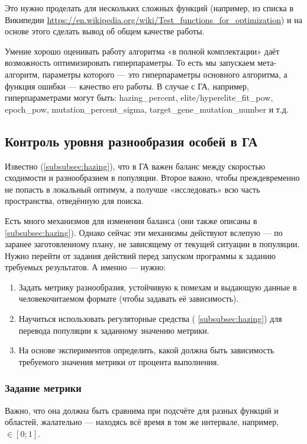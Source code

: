 Это нужно проделать для нескольких сложных функций (например, из списка в Википедии \href{https://en.wikipedia.org/wiki/Test_functions_for_optimization}{https://en.wikipedia.org/wiki/Test_functions_for_optimization})
и на основе этого сделать вывод об общем качестве работы.

Умение хорошо оценивать работу алгоритма «в полной комплектации» даёт возможность оптимизировать гиперпараметры.
То есть мы запускаем мета-алгоритм, параметры которого — это гиперпараметры основного алгоритма, а функция ошибки — качество его работы.
В случае с ГА, например, гиперпараметрами могут быть: hazing_percent, elite/hyperelite_fit_pow, epoch_pow, mutation_percent_sigma, target_gene_mutation_number и т.д.


\subsection{Контроль уровня разнообразия особей в ГА}\label{subsec:control_GA_diversity}
Известно (\ref{subsubsec:hazing}), что в ГА важен баланс между скоростью сходимости и разнообразием в популяции.
Второе важно, чтобы преждевременно не попасть в локальный оптимум, а получше «исследовать» всю часть пространства, отведённую для поиска.

Есть много механизмов для изменения баланса (они также описаны в \ref{subsubsec:hazing}).
Однако сейчас эти механизмы действуют вслепую — по заранее заготовленному плану, не зависящему от текущей ситуации в популяции.
Нужно перейти от задания действий перед запуском программы к заданию требуемых результатов.
А именно — нужно:
\begin{enumerate}
    \item Задать метрику разнообразия, устойчивую к помехам и выдающую данные в человекочитаемом формате (чтобы задавать её зависимость).
    \item Научиться использовать регуляторные средства ( \ref{subsubsec:hazing}) для перевода популяции к заданному значению метрики.
    \item На основе экспериментов определить, какой должна быть зависимость требуемого значения метрики от процента выполнения.
\end{enumerate}

\subsubsection{Задание метрики}
Важно, что она должна быть сравнима при подсчёте для разных функций и областей, жалательно — находясь всё время в том же интервале, например,
$\in [0; 1]$.

